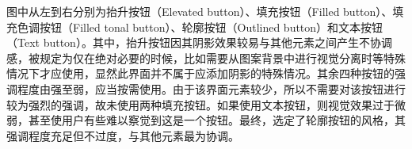 \begin{figure}[!ht]
    \label{fig:buttons}
\end{figure}

图中从左到右分别为抬升按钮（Elevated button）、填充按钮（Filled button）、填充色调按钮（Filled tonal button）、轮廓按钮（Outlined button）和文本按钮（Text button）。其中，抬升按钮因其阴影效果较易与其他元素之间产生不协调感，被规定为仅在绝对必要的时候，比如需要从图案背景中进行视觉分离时等特殊情况下才应使用，显然此界面并不属于应添加阴影的特殊情况。其余四种按钮的强调程度由强至弱，应当按需使用。由于该界面元素较少，所以不需要对该按钮进行较为强烈的强调，故未使用两种填充按钮。如果使用文本按钮，则视觉效果过于微弱，甚至使用户有些难以察觉到这是一个按钮。最终，选定了轮廓按钮的风格，其强调程度充足但不过度，与其他元素最为协调。

